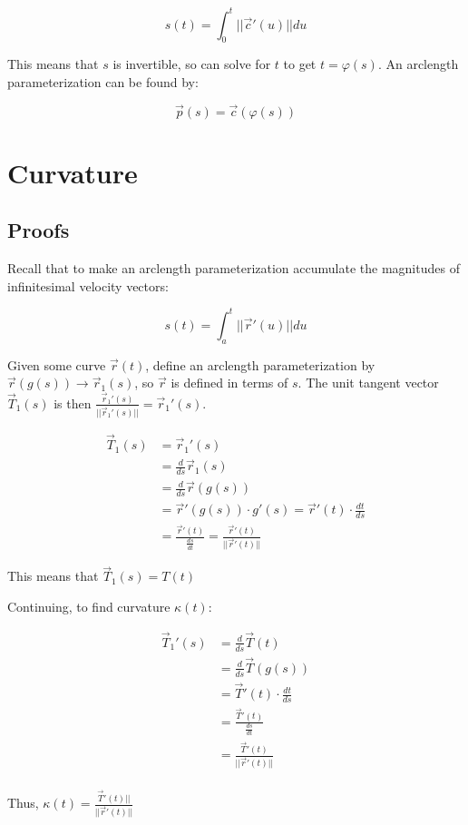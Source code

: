 \[s(t)=\int_0^t||\vec{c}'(u)||du\]

\noindent
This means that $s$ is invertible, so can solve for $t$ to get $t=\varphi(s)$.
An arclength parameterization can be found by:

\[\boxed{\vec{p}(s)=\vec{c}(\varphi(s))}\]

\section{Curvature}

\subsection{Proofs}

Recall that to make an arclength parameterization accumulate the magnitudes of infinitesimal velocity vectors:

\[s(t)=\int_a^t ||\vec{r}'(u)||du\]

Given some curve $\vec{r}(t)$, define an arclength parameterization by $\vec{r}(g(s))\rightarrow \vec{r}_1(s)$, so 
$\vec{r}$ is defined in terms of $s$. The unit tangent vector $\vec{T}_1(s)$ is then $\frac{\vec{r}_1'(s)}{||\vec{r}_1'(s)||}=\vec{r}_1'(s)$.

\begin{align*}
    \vec{T}_1(s)&=\vec{r}_1'(s)\\
    &=\frac{d}{ds}\vec{r}_1(s)\\
    &=\frac{d}{ds}\vec{r}(g(s))\\
    &=\vec{r}'(g(s))\cdot g'(s)=\vec{r}'(t)\cdot \frac{dt}{ds}\\
    &=\frac{\vec{r}'(t)}{\frac{ds}{dt}}=\frac{\vec{r}'(t)}{||\vec{r}'(t)||}
\end{align*}

This means that $\vec{T}_1(s)=T(t)$

Continuing, to find curvature $\kappa(t)$:

\begin{align*}
    \vec{T}_1'(s)&=\frac{d}{ds}\vec{T}(t)\\
    &=\frac{d}{ds}\vec{T}(g(s))\\
    &=\vec{T}'(t)\cdot \frac{dt}{ds}\\
    &=\frac{\vec{T}'(t)}{\frac{ds}{dt}}\\
    &=\frac{\vec{T}'(t)}{||\vec{r}'(t)||}\\
\end{align*}

Thus, $\boxed{\kappa(t)=\frac{\vec{T}'(t)||}{||\vec{r}'(t)||}}$

